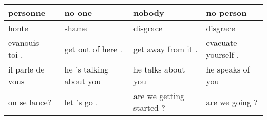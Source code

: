 \documentclass[11pt,a4paper]{article}
\begin{document}
\begin{table*}[]
\begin{tabular}{|p{3.5cm}|p{3.5cm}|p{3.5cm}|p{3.5cm}|}
personne                                                                                                                                          & no one                                                                                                                     & nobody                                                                                                                                           & no person                                                                                                                                       \\ \hline
honte                                                                                                                                             & shame                                                                                                                        & disgrace                                                                                                                                            & disgrace                                                                                                                                          \\ \hline
evanouis - toi .                                                                                                                                  & get out of here .                                                                                                            & get away from it .                                                                                                                                  & evacuate yourself .                                                                                                                               \\ \hline
il parle de vous                                                                                                                                  & he 's talking about you                                                                                                      & he talks about you                                                                                                                                  & he speaks of you                                                                                                                                  \\ \hline
on se lance?                                                                                                                                      & let 's go .                                                                                                                  & are we getting started ?                                                                                                                            & are we going ?                                                                                                                                    \\ \hline

\end{tabular}
\end{table*}
\end{document}
